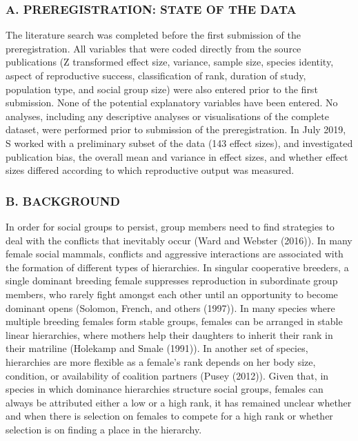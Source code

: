 \documentclass[]{article}
\begin{document}
\hypertarget{a.-preregistration-state-of-the-data}{%
\subsubsection{A. PREREGISTRATION: STATE OF THE
DATA}\label{a.-preregistration-state-of-the-data}}

The literature search was completed before the first submission of the
preregistration. All variables that were coded directly from the source
publications (Z transformed effect size, variance, sample size, species
identity, aspect of reproductive success, classification of rank,
duration of study, population type, and social group size) were also
entered prior to the first submission. None of the potential explanatory
variables have been entered. No analyses, including any descriptive
analyses or visualisations of the complete dataset, were performed prior
to submission of the preregistration. In July 2019, S worked with a
preliminary subset of the data (143 effect sizes), and investigated
publication bias, the overall mean and variance in effect sizes, and
whether effect sizes differed according to which reproductive output was
measured.

\hypertarget{b.-background}{%
\subsubsection{B. BACKGROUND}\label{b.-background}}

In order for social groups to persist, group members need to find
strategies to deal with the conflicts that inevitably occur (Ward and
Webster (2016)). In many female social mammals, conflicts and aggressive
interactions are associated with the formation of different types of
hierarchies. In singular cooperative breeders, a single dominant
breeding female suppresses reproduction in subordinate group members,
who rarely fight amongst each other until an opportunity to become
dominant opens (Solomon, French, and others (1997)). In many species
where multiple breeding females form stable groups, females can be
arranged in stable linear hierarchies, where mothers help their
daughters to inherit their rank in their matriline (Holekamp and Smale
(1991)). In another set of species, hierarchies are more flexible as a
female's rank depends on her body size, condition, or availability of
coalition partners (Pusey (2012)). Given that, in species in which
dominance hierarchies structure social groups, females can always be
attributed either a low or a high rank, it has remained unclear whether
and when there is selection on females to compete for a high rank or
whether selection is on finding a place in the hierarchy.
\end{document}
